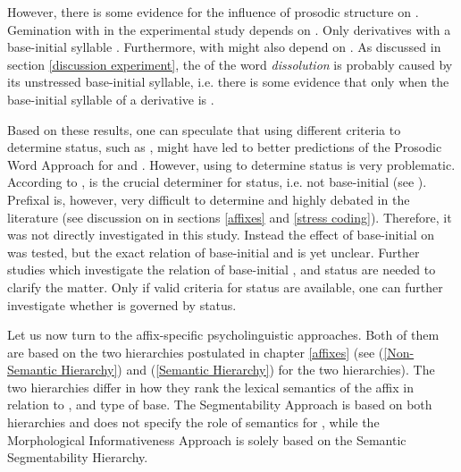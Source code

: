 However, there is some evidence 
for the influence of prosodic structure on . 
Gemination with  in the experimental study depends on . Only derivatives with a  base-initial syllable . Furthermore,  with  might also depend on . As discussed in section  \ref{discussion experiment}, the  of the word \textit{dissolution} is probably caused by its unstressed base-initial syllable, i.e. there is some evidence that  only  when the base-initial syllable of a derivative is . 

Based on these results, one can speculate that using different criteria to determine  status, such as , might have led to better predictions of the Prosodic Word Approach for  and . 
However, using  to determine  status is very problematic. %
 According to \cite{Raffelsiefen.1999},  is the crucial determiner for  status, i.e. not base-initial  (see ). Prefixal  is, however, very difficult to determine and highly debated in the literature (see discussion on  in sections \ref{affixes} and \ref{stress coding}). Therefore, it was not directly investigated in this study. Instead the effect of base-initial  on  was tested, but the exact relation of base-initial  and  is yet unclear.
Further studies which investigate the relation of base-initial ,  and  status are needed to clarify the matter. Only if valid criteria for  status are available, one can further investigate whether  is governed by  status. 

 




Let us now turn to the affix-specific psycholinguistic approaches. Both of them are based on the two  hierarchies postulated in chapter \ref{affixes} (see  (\ref{Non-Semantic Hierarchy})  and (\ref{Semantic Hierarchy}) for the two hierarchies).
The two hierarchies differ in how they rank the lexical semantics of the affix in relation to ,  and type of base. The Segmentability Approach is based on both hierarchies and does not specify the role of semantics for , while the Morphological Informativeness Approach is solely based on the Semantic Segmentability Hierarchy.%

